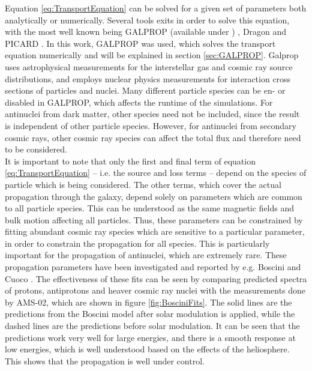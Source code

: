 Equation \ref{eq:TransportEquation} can be solved for a given set of parameters both analytically or numerically. Several tools exits in order to solve this equation, with the most well known being GALPROP (available under ) \cite{Galprop_propagation}, Dragon \cite{Dragon} and PICARD \cite{Kissmann_2014}. In this work, GALPROP was used, which solves the transport equation numerically and will be explained in section \ref{sec:GALPROP}. Galprop uses astrophysical measurements for the interstellar gas and cosmic ray source distributions, and employs nuclear physics measurements for interaction cross sections of particles and nuclei. Many different particle species can be en- or disabled in GALPROP, which affects the runtime of the simulations. For antinuclei from dark matter, other species need not be included, since the result is independent of other particle species. However, for antinuclei from secondary cosmic rays, other cosmic ray species can affect the total flux and therefore need to be considered.\\

It is important to note that only the first and final term of equation \ref{eq:TransportEquation} -- i.e. the source and loss terms -- depend on the species of particle which is being considered. The other terms, which cover the actual propagation through the galaxy, depend solely on parameters which are common to all particle species. This can be understood as the same magnetic fields and bulk motion affecting all particles. Thus, these parameters can be constrained by fitting abundant cosmic ray species which are sensitive to a particular parameter, in order to constrain the propagation for all species. This is particularly important for the propagation of antinuclei, which are extremely rare. These propagation parameters have been investigated and reported by e.g. Boscini \cite{Boschini:2017fxq, Boschini:2018baj} and Cuoco \cite{Cuoco_2019}. The effectiveness of these fits can be seen by comparing predicted spectra of protons, antiprotons and heaver cosmic ray nuclei with the measurements done by AMS-02, which are shown in figure \ref{fig:BosciniFits}. The solid lines are the predictions from the Boscini model after solar modulation is applied, while the dashed lines are the predictions before solar modulation. It can be seen that the predictions work very well for large energies, and there is a smooth response at low energies, which is well understood based on the effects of the heliosphere. This shows that the propagation is well under control.\\


